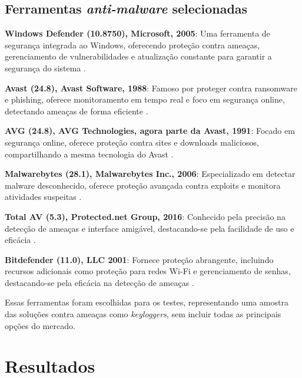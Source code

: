 \documentclass[12pt]{article}
\begin{document}
\subsection{Ferramentas \textit{anti-malware} selecionadas}

\textbf{Windows Defender (10.8750), Microsoft, 2005}: Uma ferramenta de segurança integrada ao Windows, oferecendo proteção contra ameaças, gerenciamento de vulnerabilidades e atualização constante para garantir a segurança do sistema \citep{MicrosoftSecurityBlog}.

\textbf{Avast (24.8), Avast Software, 1988}: Famoso por proteger contra ransomware e phishing, oferece monitoramento em tempo real e foco em segurança online, detectando ameaças de forma eficiente \citep{Avast}.

\textbf{AVG (24.8), AVG Technologies, agora parte da Avast, 1991}: Focado em segurança online, oferece proteção contra sites e downloads maliciosos, compartilhando a mesma tecnologia do Avast \citep{AVG}.

\textbf{Malwarebytes (28.1), Malwarebytes Inc., 2006}: Especializado em detectar malware desconhecido, oferece proteção avançada contra exploits e monitora atividades suspeitas \citep{Malwarebytes}.

\textbf{Total AV (5.3), Protected.net Group, 2016}: Conhecido pela precisão na detecção de ameaças e interface amigável, destacando-se pela facilidade de uso e eficácia \citep{TotalAV}.

\textbf{Bitdefender (11.0), LLC 2001}: Fornece proteção abrangente, incluindo recursos adicionais como proteção para redes Wi-Fi e gerenciamento de senhas, destacando-se pela eficácia na detecção de ameaças \citep{Bitdefender}.

Essas ferramentas foram escolhidas para os testes, representando uma amostra das soluções contra ameaças como \textit{keyloggers}, sem incluir todas as principais opções do mercado.

\section{Resultados}
\end{document}
